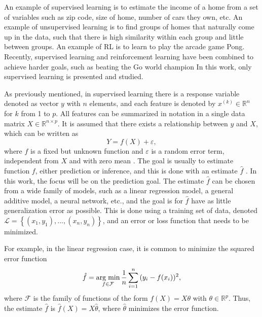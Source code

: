 An example of supervised learning is to estimate the income of a home from a set of variables such as zip code, size of home, number of cars they own, etc. An example of unsupervised learning is to find groups of homes that naturally come up in the data, such that there is high similarity within each group and little between groups. An example of RL is to learn to play the arcade game Pong. Recently, supervised learning and reinforcement learning have been combined to achieve harder goals, such as beating the Go world champion \cite{silver2017mastering} In this work, only supervised learning is presented and studied.

As previously mentioned, in supervised learning there is a response variable denoted as vector $y$ with $n$ elements, and each feature is denoted by $x^{(k)} \in \mathbb{R}^n$ for $k$ from 1 to $p$. All features can be summarized in notation in a single data matrix $X \in \mathbb{R}^{n \times p}$. It is assumed that there exists a relationship between $y$ and $X$, which can be written as
\begin{equation}
  \label{eq:general_learning_model}
  Y = f(X) + \varepsilon,
\end{equation}
where $f$ is a fixed but unknown function and $\varepsilon$ is a random error term, independent from $X$ and with zero mean \cite[p.~16]{james2013introduction}. The goal is usually to estimate function $f$, either prediction or inference, and this is done with an estimate $\hat{f}$ \cite[p.~17]{james2013introduction}.
In this work, the focus will be on the prediction goal.
The estimate $\hat{f}$ can be chosen from a wide family of models, such as a linear regression model, a general additive model, a neural network, etc., and the goal is for $\hat{f}$ have as little generalization error as possible. This is done using a training set of data, denoted $\mathcal{L} = \left\{ (x_1, y_1), ..., (x_n, y_n) \right\}$, and an error or loss function that needs to be minimized.

For example, in the linear regression case, it is common to minimize the squared error function
\begin{equation}
  \hat{f} = \operatorname*{arg\; min}_{f \in \mathcal{F}} \frac{1}{n} \sum_{i = 1}^n{ ( y_i - f(x_i) ) ^ 2},
\end{equation}
where $\mathcal{F}$ is the family of functions of the form $f(X) = X\theta$ with $\theta \in \mathbb{R}^p$. Thus, the  estimate $\hat{f}$ is $\hat{f}(X) = X \hat{\theta}$, where $\hat{\theta}$ minimizes the error function.

